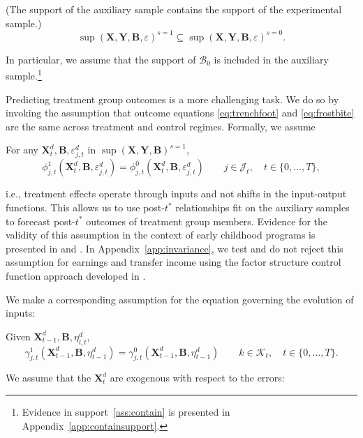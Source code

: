 \begin{assumption} \label{ass:contain} (The support of the auxiliary sample contains the support of the experimental sample.)
\begin{equation*}
\sup(\bm{X}, \bm{Y}, \bm{B}, \varepsilon)^{s=1} \subseteq \sup (\bm{X}, \bm{Y}, \bm{B}, \varepsilon)^{s=0}.
\end{equation*}
\end{assumption}
In particular, we assume that the support of $\mathcal{B}_0$ is included in the auxiliary sample.\footnote{Evidence in support~\eqref{ass:contain} is presented in Appendix~\ref{app:containsupport}.}

Predicting treatment group outcomes is a more challenging task. We do so by invoking the assumption that outcome equations \eqref{eq:trenchfoot} and \eqref{eq:frostbite} are the same across treatment and control regimes. Formally, we assume

\renewcommand\theassumption{A--\arabic{assumption}(a)}
\begin{assumption}\label{ass:eczema}
For any $\bm{X}^d_t, \bm{B}, \varepsilon^d_{j,t}$ in $\sup(\bm{X},\bm{Y},\bm{B})^{s=1}$,
\begin{equation*}
\phi^1_{j,t} (\bm{X}^d_t, \bm{B}, \varepsilon^d_{j,t}) = \phi^0_{j,t} (\bm{X}^d_t, \bm{B}, \varepsilon^d_{j,t}) \qquad j \in \mathcal J_t, \quad t \in \{0,\dots,T\},
\end{equation*}
\end{assumption}
i.e., treatment effects operate through inputs and not shifts in the input-output functions. This allows us to use post-$t^*$ relationships fit on the auxiliary samples to forecast post-$t^*$ outcomes of treatment group members. Evidence for the validity of this assumption in the context of early childhood programs is presented in \citet{Heckman_Pinto_etal_2013_PerryFactor} and \citet{Attanasio-etal_2015_NBER_Estimating-Production}. In Appendix~\ref{app:invariance}, we test and do not reject this assumption for earnings and transfer income using the factor structure control function approach developed in \citet{Heckman_Pinto_etal_2013_PerryFactor}.

We make a corresponding assumption for the equation governing the evolution of inputs:
\addtocounter{assumption}{-1}
\renewcommand\theassumption{A--\arabic{assumption}(b)}
\begin{assumption}\label{ass:psoriasis}
Given $\bm{X}^d_{t-1}, \bm{B}, \eta^d_{l,t}$,
\begin{equation*}
\gamma^1_{j,t} (\bm{X}^d_{t-1}, \bm{B}, \eta^d_{t-1}) = \gamma^0_{j,t} (\bm{X}^d_{t-1}, \bm{B}, \eta^d_{t-1}) \qquad k \in \mathcal{K}_t, \quad t \in \{0,\dots,T\}.
\end{equation*}
\end{assumption}
We assume that the $\bm{X}^d_t$ are exogenous with respect to the errors:

